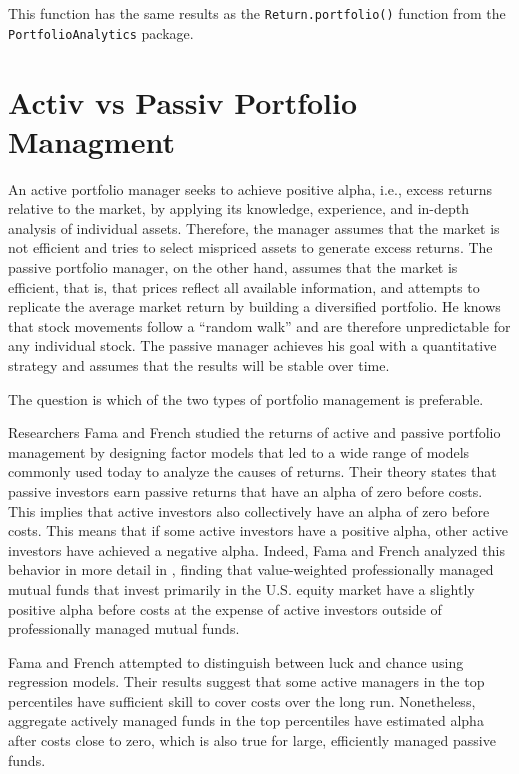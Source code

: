 \documentclass[
  oneside]{book}
\begin{document}
This function has the same results as the \texttt{Return.portfolio()} function from the \texttt{PortfolioAnalytics} package.

\hypertarget{activ-vs-passiv-portfolio-managment}{%
\chapter{Activ vs Passiv Portfolio Managment}\label{activ-vs-passiv-portfolio-managment}}

An active portfolio manager seeks to achieve positive alpha, i.e., excess returns relative to the market, by applying its knowledge, experience, and in-depth analysis of individual assets. Therefore, the manager assumes that the market is not efficient and tries to select mispriced assets to generate excess returns. The passive portfolio manager, on the other hand, assumes that the market is efficient, that is, that prices reflect all available information, and attempts to replicate the average market return by building a diversified portfolio. He knows that stock movements follow a ``random walk'' and are therefore unpredictable for any individual stock. The passive manager achieves his goal with a quantitative strategy and assumes that the results will be stable over time.

The question is which of the two types of portfolio management is preferable.

Researchers Fama and French studied the returns of active and passive portfolio management by designing factor models that led to a wide range of models commonly used today to analyze the causes of returns. Their theory states that passive investors earn passive returns that have an alpha of zero before costs. This implies that active investors also collectively have an alpha of zero before costs. This means that if some active investors have a positive alpha, other active investors have achieved a negative alpha. Indeed, Fama and French analyzed this behavior in more detail in \citep{FaFr2010}, finding that value-weighted professionally managed mutual funds that invest primarily in the U.S. equity market have a slightly positive alpha before costs at the expense of active investors outside of professionally managed mutual funds.

Fama and French attempted to distinguish between luck and chance using regression models. Their results suggest that some active managers in the top percentiles have sufficient skill to cover costs over the long run. Nonetheless, aggregate actively managed funds in the top percentiles have estimated alpha after costs close to zero, which is also true for large, efficiently managed passive funds.
\end{document}
